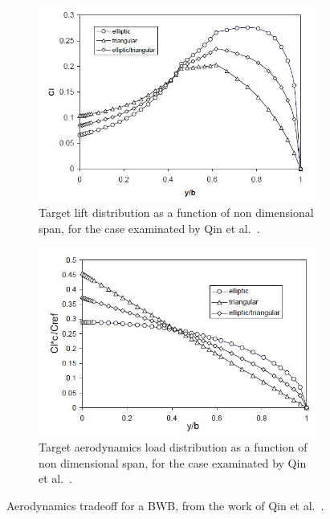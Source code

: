\begin{figure}[!h]
	\centering
	\begin{subfigure}{0.5\textwidth}
		\centering
		\includegraphics[keepaspectratio, width=\linewidth]{images/chap1/cl_target.jpg}
		\caption{Target lift distribution as a function of non dimensional span, for the case examinated by Qin et al.~\cite{bib:qin}.}
		\label{fig:qin_cl_target}
	\end{subfigure}
	\begin{subfigure}{0.5\textwidth}
		\centering
		\includegraphics[keepaspectratio, width=\linewidth]{images/chap1/load_target.jpg}
		\caption{Target aerodynamics load distribution as a function of non dimensional span, for the case examinated by Qin et al.~\cite{bib:qin}.}
		\label{fig:qin_load_target}
	\end{subfigure}
	\caption{Aerodynamics tradeoff for a BWB, from the work of Qin et al.~\cite{bib:qin}.}
	\label{fig:qin_results}
\end{figure}

